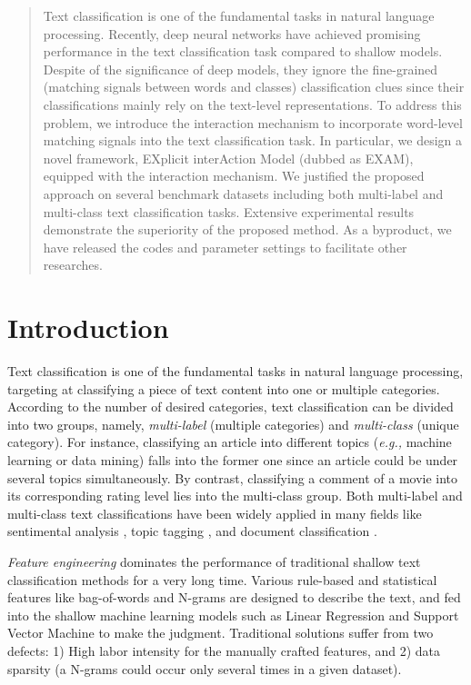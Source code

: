 \documentclass[letterpaper]{article} %
\newcommand{\eg}{\emph{e.g., }}
\begin{document}
\begin{abstract}
Text classification is one of the fundamental tasks in natural language processing. Recently, deep neural networks have achieved promising performance in the text classification task compared to shallow models. Despite of the significance of deep models, they ignore the fine-grained (matching signals between words and classes) classification clues since their classifications mainly rely on the text-level representations. To address this problem, we introduce the interaction mechanism to incorporate word-level matching signals into the text classification task. In particular, we design a novel framework, EXplicit interAction Model (dubbed as EXAM), equipped with the interaction mechanism. We justified the proposed approach on several benchmark datasets including  both multi-label and multi-class text classification tasks. Extensive experimental results demonstrate the superiority of the proposed method. As a byproduct, we have released the codes and parameter settings to facilitate other researches. 
\end{abstract}

\section{Introduction}
Text classification is one of the fundamental tasks in natural language processing, targeting at classifying a  piece of text content into one or multiple categories. According to the number of desired categories, text classification can be divided into two groups, namely, \textit{multi-label} (multiple categories) and \textit{multi-class} (unique category). For instance, classifying an article into different topics (\eg machine learning or data mining) falls into the former one since an article could be under several topics simultaneously. By contrast, classifying a comment of a movie into its corresponding rating level lies into the multi-class group. Both multi-label and multi-class text classifications have been widely applied in many fields like sentimental analysis \cite{SenticNet}, topic tagging \cite{fasttext}, and document classification \cite{HAN}.

\textit{Feature engineering} dominates the performance of traditional shallow text classification methods for a very long time. Various rule-based and statistical features like bag-of-words \cite{bow} and N-grams \cite{ngram} are designed to describe the text, and fed into the shallow machine learning models such as Linear Regression \cite{LR} and Support Vector Machine \cite{Cortes1995SupportvectorN} to make the judgment. Traditional solutions suffer from two defects: 1) High labor intensity for the manually crafted features, and 2) data sparsity (a N-grams could occur only several times in a given dataset). 
\end{document}
